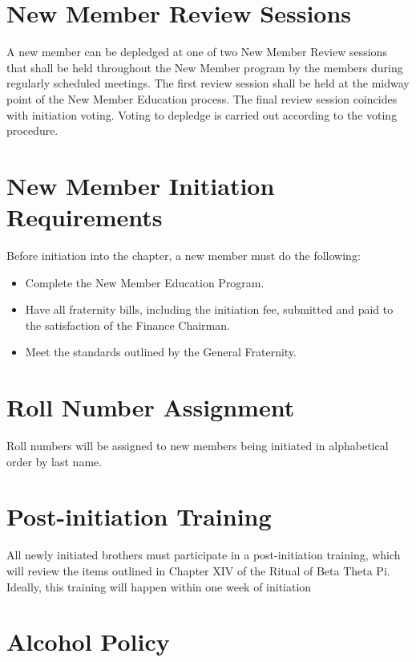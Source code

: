 \section{New Member Review Sessions}

A new member can be depledged at one of two New Member Review sessions that
shall be held throughout the New Member program by the members during regularly
scheduled meetings.
The first review session shall be held at the midway point of the New Member
Education process.
The final review session coincides with initiation voting.
Voting to depledge is carried out according to the voting procedure.

\section{New Member Initiation Requirements}

Before initiation into the chapter, a new member must do the following:
\begin{itemize}
    \item Complete the New Member Education Program.
    \item Have all fraternity bills, including the initiation fee, submitted
        and paid to the satisfaction of the Finance Chairman.
    \item Meet the standards outlined by the General Fraternity.
\end{itemize}

\section{Roll Number Assignment}

Roll numbers will be assigned to new members being initiated in alphabetical
order by last name.

\section{Post-initiation Training}

All newly initiated brothers must participate in a post-initiation training,
which will review the items outlined in Chapter XIV of the Ritual of Beta Theta
Pi.
Ideally, this training will happen within one week of initiation

\section{Alcohol Policy}

